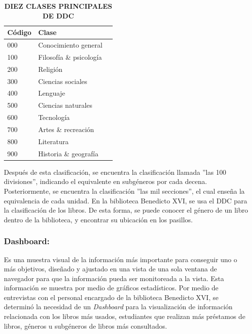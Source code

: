 \documentclass[spanish]{ieee_upb}
\begin{document}
\begin{table}[htpb]
    \centering
    \caption[Decimal Dewey Classification (DDC)]{\bfseries DIEZ CLASES PRINCIPALES DE DDC}
    \label{tab:clasificacion_decimal}
    \begin{tabular}{lll} \hline
     
        \textbf{Código} & \textbf{Clase} \\ \hline
        000 & Conocimiento general \\ 
        100 & Filosofía \& psicología\hspace{7.5cm} \\ 
        200 & Religión \\ 
        300 & Ciencias sociales \\ 
        400 & Lenguaje \\ 
        500 & Ciencias naturales \\
        600 & Tecnología \\ 
        700 & Artes \& recreación \\ 
        800 & Literatura \\ 
        900 & Historia \& geografía \\ \hline
    \end{tabular}
    \vspace{-2mm}
    \newline
\end{table}




Después de esta clasificación, se encuentra la clasificación llamada ''las 100 divisiones'', indicando el equivalente en subgéneros por cada decena. Posteriormente, se encuentra la clasificación ''las mil secciones'', el cual enseña la equivalencia de cada unidad. En la biblioteca Benedicto XVI, se usa el DDC para la clasificación de los libros. De esta forma, se puede conocer el género de un libro dentro de la biblioteca, y encontrar su ubicación en los pasillos. 


  \subsubsection{Dashboard: } Es una muestra visual de la información más importante para conseguir uno o más objetivos, diseñado y ajustado en una vista de una sola ventana de navegador para que la información pueda ser monitoreada a la vista. Esta información se muestra por medio de gráficos estadísticos\cite{few2006information}. Por medio de entrevistas con el personal encargado de la biblioteca Benedicto XVI, se determinó la necesidad de un \textit{Dashboard} para la visualización de información relacionada con los libros más usados, estudiantes que realizan más préstamos de libros, géneros u subgéneros de libros más consultados.  
\end{document}
